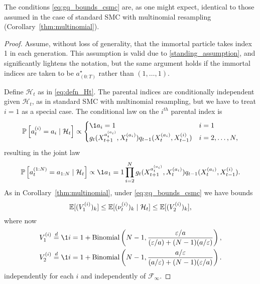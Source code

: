 The conditions \eqref{eq:gq_bounds_csmc} are, as one might expect, identical to those assumed in the case of standard SMC with multinomial resampling (Corollary~\ref{thm:multinomial}).

\begin{proof}
Assume, without loss of generality, that the immortal particle takes index 1 in each generation. This assumption is valid due to \ref{standing_assumption}, and significantly lightens the notation, but the same argument holds if the immortal indices are taken to be $a_{(0:T)}^\star$ rather than $(1,\dots,1)$.

Define $\mathcal{H}_t$ as in \eqref{eq:defn_Ht}.
The parental indices are conditionally independent given $\mathcal{H}_t$, as in standard SMC with multinomial resampling, but we have to treat $i=1$ as a special case. The conditional law on the $i^{th}$ parental index is
\begin{equation*}
\Prob \left[ a_t^{(i)} = a_i \mid \mathcal{H}_t \right] \propto
\begin{cases}
\1{a_i=1} &i=1 \\
g_t( X_{t+1}^{a_t^{(a_i)}} , X_t^{(a_i)} ) q_{t-1}(X_t^{(a_i)}, X_{t-1}^{(i)}) &i=2,\dots,N ,
\end{cases}
\end{equation*}
resulting in the joint law
\begin{equation*}
\Prob \left[ a_t^{(1:N)} = a_{1:N} \mid \mathcal{H}_t \right] 
\propto \1{a_1 = 1} \prod_{i=2}^N g_t( X_{t+1}^{a_t^{(a_i)}} , X_t^{(a_i)} )  
        q_{t-1}(X_t^{(a_i)}, X_{t-1}^{(i)}).
\end{equation*}
As in Corollary~\ref{thm:multinomial}, under \eqref{eq:gq_bounds_csmc} we have bounds
\begin{equation*}
\mathbb{E}[ (V_1^{(i)})_k ]
\leq \mathbb{E}[ (\nu_t^{(i)})_k \mid \mathcal{H}_t ]
\leq \mathbb{E}[ (V_2^{(i)})_k ] ,
\end{equation*}
where now
\begin{align*}
& V_1^{(i)} 
    \eqdist \1{i=1} + \operatorname{Binomial}\left(N-1, 
        \frac{\varepsilon/a}{(\varepsilon/a) + (N-1)(a/\varepsilon)} \right) , \\
& V_2^{(i)} 
    \eqdist \1{i=1} + \operatorname{Binomial}\left( N-1, 
        \frac{a/\varepsilon}{(a/\varepsilon) + (N-1)(\varepsilon/a)} \right) .
\end{align*}
independently for each $i$ and independently of $\mathcal{F}_\infty$.

\end{proof}
